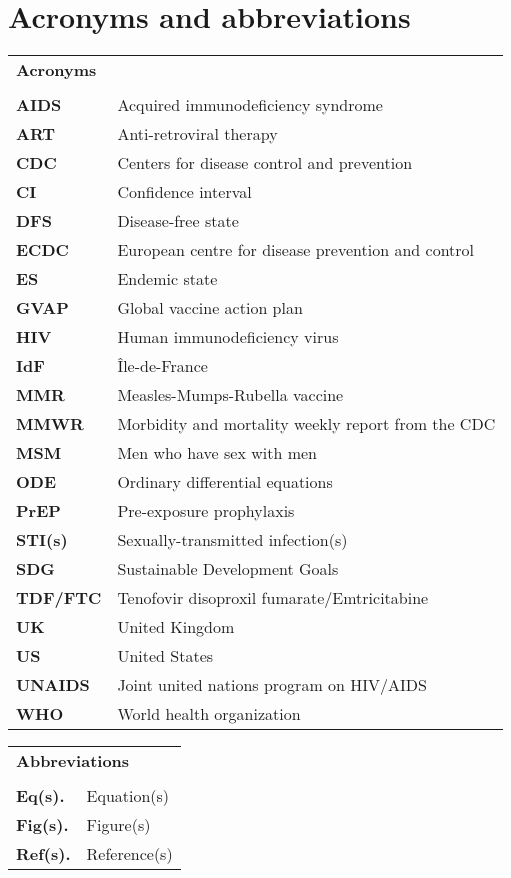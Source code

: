 \chapter*{Acronyms and abbreviations}


\begin{table}[H]
\begin{tabular}{ll}
	\multicolumn{2}{l}{\large \bf Acronyms}\\
	\\
	\bf AIDS		& Acquired immunodeficiency syndrome\\
	\bf ART 		& Anti-retroviral therapy \\
	\bf CDC 		& Centers for disease control and prevention\\
	\bf CI 		& Confidence interval \\
	\bf DFS 		& Disease-free state \\
	\bf ECDC 		& European centre for disease prevention and control\\
	\bf ES 		& Endemic state \\
	\bf GVAP 		& Global vaccine action plan\\
	\bf HIV 		& Human immunodeficiency virus \\
	\bf IdF 		& \^Ile-de-France \\
	\bf MMR 		& Measles-Mumps-Rubella vaccine\\
	\bf MMWR	& Morbidity and mortality weekly report from the CDC\\
	\bf MSM 		& Men who have sex with men \\
	\bf ODE 		& Ordinary differential equations \\
	\bf PrEP 		& Pre-exposure prophylaxis \\
	\bf STI(s)		& Sexually-transmitted infection(s) \\
	\bf SDG		& Sustainable Development Goals \\
	\bf TDF/FTC 	& Tenofovir disoproxil fumarate/Emtricitabine \\
	\bf UK 		& United Kingdom\\
	\bf US		& United States\\
	\bf UNAIDS 	& Joint united nations program on HIV/AIDS \\
	\bf WHO		& World health organization \\
\end{tabular}
\end{table}

\vfill
\newpage

\begin{table}[H]
\begin{tabular}{ll}
	\multicolumn{2}{l}{\large \bf Abbreviations}\\
	\\
	\bf Eq(s). 		& Equation(s) \\
	\bf Fig(s). 		& Figure(s) \\
	\bf Ref(s).		& Reference(s) \\
\end{tabular}
\end{table}


